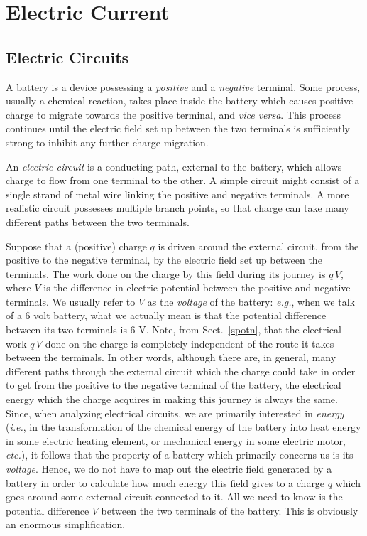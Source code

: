 \section{Electric Current}
\subsection{Electric Circuits}
A battery is a device possessing  a {\em positive}\/ and a {\em
negative}\/
terminal. Some process, usually a chemical reaction, takes place inside the
battery which causes positive charge to migrate towards the positive terminal,
and {\em vice versa}. This process
continues until the electric field set up between the two terminals is
sufficiently strong to inhibit any further charge migration.

An {\em electric circuit}\/ is a conducting path, external
to the battery,  which allows charge to
flow from one terminal 
to the other. A simple circuit might consist of a
single strand of metal wire linking the positive and negative terminals.
A more realistic circuit possesses multiple branch points, so that charge can take
many different paths between the two terminals. 

Suppose that a (positive) charge $q$ is driven around the external
circuit, from the positive to
the negative terminal, by the electric field set up between the
terminals. The work done on the charge by this field during its
journey  is $q\,V$, where $V$ is the difference
in electric potential between the positive and negative terminals. We usually refer to $V$ as the {\em voltage} of the battery:
{\em e.g.}, when we talk of a 6 volt battery, what we actually  mean is
that the potential difference between its two terminals is 6 V. Note, from
Sect.~\ref{spotn}, that the electrical work $q\,V$ done on the charge 
is completely independent of the route it takes between the
 terminals. In other words, although there are, in general,
 many
different paths through the external circuit which the charge could take in order
to get from the positive to the negative terminal of the 
battery, the electrical energy which
the charge acquires in making this journey is always the same. Since, when analyzing
electrical circuits, we are primarily interested in {\em energy}\/ ({\em i.e.}, 
in the transformation of the chemical energy of the battery into
heat energy in some electric heating element, or mechanical
energy in some electric motor, {\em etc.}), 
it follows that the  property of a battery which primarily concerns us is its
{\em voltage}. Hence, we do not have to map out the  electric field
generated by a battery in order to calculate how much energy this field gives to
a charge $q$  which goes around some external circuit connected to it.
All we need to know is the potential difference $V$ between the two terminals
of the battery. This is obviously an enormous simplification. 

